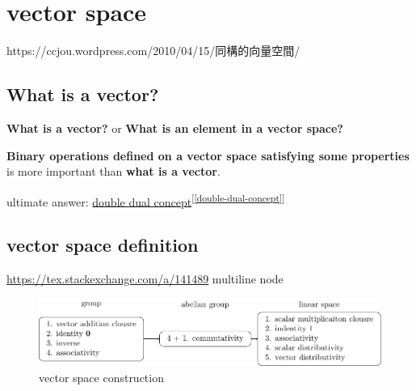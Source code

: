 \documentclass[
]{book}
\theoremstyle{definition}
\theoremstyle{definition}
\theoremstyle{definition}
\theoremstyle{definition}
\theoremstyle{remark}
\begin{document}
\hypertarget{vector-space}{%
\chapter{vector space}\label{vector-space}}

\begin{CJK}{UTF8}{bsmi}
https://ccjou.wordpress.com/2010/04/15/同構的向量空間/
\end{CJK}

\hypertarget{what-is-a-vector}{%
\section{What is a vector?}\label{what-is-a-vector}}

\textbf{What is a vector?} or \textbf{What is an element in a vector space?}

\textbf{Binary operations defined on a vector space satisfying some properties} is more important than \textbf{what is a vector}.

ultimate answer: \protect\hyperlink{double-dual-concept}{double dual concept}\textsuperscript{{[}\ref{double-dual-concept}{]}}

\hypertarget{vector-space-definition}{%
\section{vector space definition}\label{vector-space-definition}}

\url{https://tex.stackexchange.com/a/141489} multiline node

\begin{figure}
\centering
\includegraphics{202403311536-vector-space_files/figure-latex/vector-construction-1.pdf}
\caption{\label{fig:vector-construction}vector space construction}
\end{figure}
\end{document}
